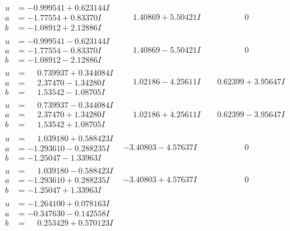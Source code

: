 \documentclass[1p]{elsarticle_modified}
\theoremstyle{definition}
\begin{document}
$$\begin{array}{c|c|c}
\begin{aligned}
u &= -0.999541 + 0.623144 I \\
a &= -1.77554 + 0.83370 I \\
b &= -1.08912 + 2.12886 I\end{aligned}
 & \phantom{-}1.40869 + 5.50421 I & \phantom{-0.000000 } 0 \\ \hline\begin{aligned}
u &= -0.999541 - 0.623144 I \\
a &= -1.77554 - 0.83370 I \\
b &= -1.08912 - 2.12886 I\end{aligned}
 & \phantom{-}1.40869 - 5.50421 I & \phantom{-0.000000 } 0 \\ \hline\begin{aligned}
u &= \phantom{-}0.739937 + 0.344084 I \\
a &= \phantom{-}2.37470 - 1.34280 I \\
b &= \phantom{-}1.53542 - 1.08705 I\end{aligned}
 & \phantom{-}1.02186 - 4.25611 I & \phantom{-}0.62399 + 3.95647 I \\ \hline\begin{aligned}
u &= \phantom{-}0.739937 - 0.344084 I \\
a &= \phantom{-}2.37470 + 1.34280 I \\
b &= \phantom{-}1.53542 + 1.08705 I\end{aligned}
 & \phantom{-}1.02186 + 4.25611 I & \phantom{-}0.62399 - 3.95647 I \\ \hline\begin{aligned}
u &= \phantom{-}1.039180 + 0.588423 I \\
a &= -1.293610 - 0.288235 I \\
b &= -1.25047 - 1.33963 I\end{aligned}
 & -3.40803 - 4.57637 I & \phantom{-0.000000 } 0 \\ \hline\begin{aligned}
u &= \phantom{-}1.039180 - 0.588423 I \\
a &= -1.293610 + 0.288235 I \\
b &= -1.25047 + 1.33963 I\end{aligned}
 & -3.40803 + 4.57637 I & \phantom{-0.000000 } 0 \\ \hline\begin{aligned}
u &= -1.264100 + 0.078163 I \\
a &= -0.347630 - 0.142558 I \\
b &= \phantom{-}0.253429 + 0.570123 I\end{aligned}

\end{array}$$
\end{document}

